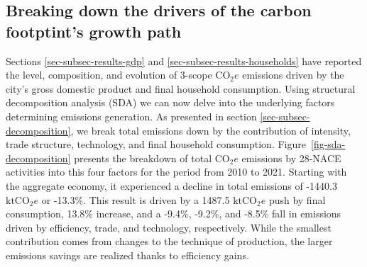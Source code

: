 \documentclass[
  10pt,
  twocolumn]{aft}
\begin{document}
\subsection{Breaking down the drivers of the carbon footptint's growth
path}\label{sec-decomposition-simulation}

Sections \ref{sec-subsec-results-gdp} and
\ref{sec-subsec-results-households} have reported the level,
composition, and evolution of 3-scope \(\text{CO}_2e\) emissions driven
by the city's gross domestic product and final household consumption.
Using structural decomposition analysis (SDA) we can now delve into the
underlying factors determining emissions generation. As presented in
section \ref{sec-subsec-decomposition}, we break total emissions down by
the contribution of intensity, trade structure, technology, and final
household consumption. Figure~\ref{fig-sda-decomposition} presents the
breakdown of total \(\text{CO}_2e\) emissions by 28-NACE activities into
this four factors for the period from 2010 to 2021. Starting with the
aggregate economy, it experienced a decline in total emissions of
-1440.3 \(\text{ktCO}_2e\) or -13.3\%. This result is driven by a 1487.5
\(\text{ktCO}_2e\) push by final consumption, 13.8\% increase, and a
-9.4\%, -9.2\%, and -8.5\% fall in emissions driven by efficiency,
trade, and technology, respectively. While the smallest contribution
comes from changes to the technique of production, the larger emissions
savings are realized thanks to efficiency gains.
\end{document}
